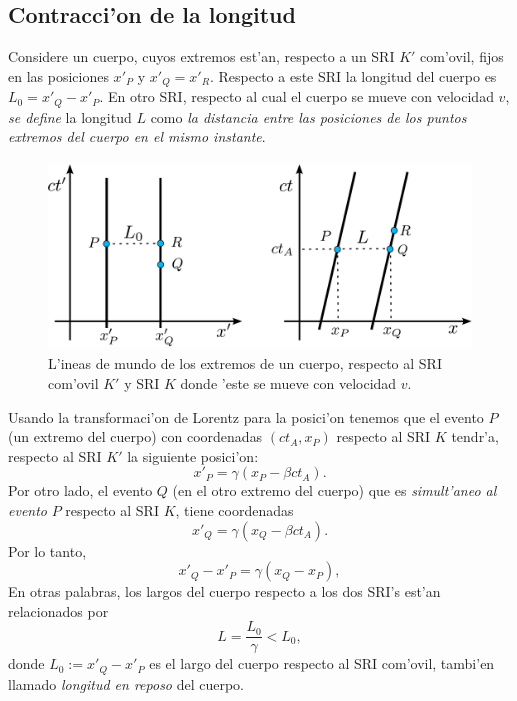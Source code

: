 \subsection{Contracci'on de la longitud}
Considere un cuerpo, cuyos extremos est'an, respecto a un SRI $K'$ com'ovil, fijos en las posiciones $x'_P$ y $x'_Q=x'_R$. Respecto a este SRI la longitud del cuerpo es $L_0=x'_Q-x'_P$. En otro SRI, respecto al cual el cuerpo se mueve con velocidad $v$, \textit{se define} la longitud $L$ como \textit{la distancia entre las posiciones de los puntos extremos del cuerpo en el mismo instante}.
\begin{figure}[!h]
\centerline{\includegraphics[height= 5cm]{fig/fig-diagrama-contraccion.pdf}}
 \caption{L'ineas de mundo de los extremos de un cuerpo, respecto al SRI com'ovil $K'$ y SRI $K$ donde 'este se mueve con velocidad $v$.}
\label{fcl}
\end{figure}

 Usando la transformaci'on de Lorentz para la posici'on tenemos que el evento $P$ (un extremo del cuerpo) con coordenadas $(ct_A,x_P)$ respecto al SRI $K$ tendr'a, respecto al SRI $K'$ la siguiente posici'on:
\begin{equation}
x'_P=\gamma(x_P-\beta c t_A).
\end{equation}
Por otro lado, el evento $Q$ (en el otro extremo del cuerpo) que es \textit{simult'aneo al evento} $P$ respecto al SRI $K$, tiene coordenadas
\begin{equation}
x'_Q=\gamma(x_Q-\beta c t_A).
\end{equation}
Por lo tanto,
\begin{equation}
x'_Q-x'_P=\gamma(x_Q-x_P),
\end{equation}
En otras palabras, los largos del cuerpo respecto a los dos SRI's est'an relacionados por
\begin{equation}
L=\frac{L_0}{\gamma}<L_0,
\end{equation}
donde $L_0:=x'_Q-x'_P$ es el largo del cuerpo respecto al SRI com'ovil, tambi'en llamado \textit{longitud en reposo} del cuerpo.

